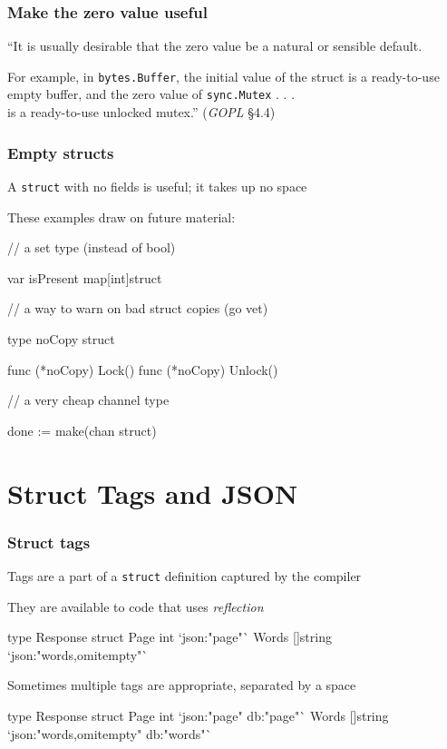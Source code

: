 \documentclass[handout,compress,t,11pt]{beamer}
\begin{document}
\begin{frame}[fragile]
    \frametitle{Make the zero value useful}
    {
    ``It is usually desirable that the zero value be a natural or sensible default. \par
     For example, in \verb|bytes.Buffer|, the initial value of the struct is a 
     ready-to-use empty buffer, and the zero value of \verb|sync.Mutex| . . . \\
     is a ready-to-use unlocked mutex.'' ({\em GOPL} \S4.4)\\}
\end{frame}

\begin{frame}[fragile]
    \frametitle{Empty structs}
    A \verb|struct| with no fields is useful; it takes up no space \par
    \vspace{0.4\baselineskip}
    These examples draw on future material: \par
\begin{golang}
// a set type (instead of bool)

var isPresent map[int]struct{}

// a way to warn on bad struct copies (go vet)

type noCopy struct{}

func (*noCopy) Lock()   {}
func (*noCopy) Unlock() {}

// a very cheap channel type

done := make(chan struct{})
\end{golang}
\end{frame}


\section{Struct Tags and JSON}
\begin{frame}[fragile]
    \frametitle{Struct tags}
    Tags are a part of a \verb|struct| definition captured by the compiler \par
    \vspace{0.4\baselineskip}
    They are available to code that uses {\em reflection}
\begin{golang}
type Response struct {
    Page  int      `json:"page"`
    Words []string `json:"words,omitempty"`
}
\end{golang}
    \vspace{\baselineskip}
    Sometimes multiple tags are appropriate, separated by a space
\begin{golang}
type Response struct {
    Page  int      `json:"page" db:"page"`
    Words []string `json:"words,omitempty" db:"words"`
}
\end{golang}
\end{frame}
\end{document}
